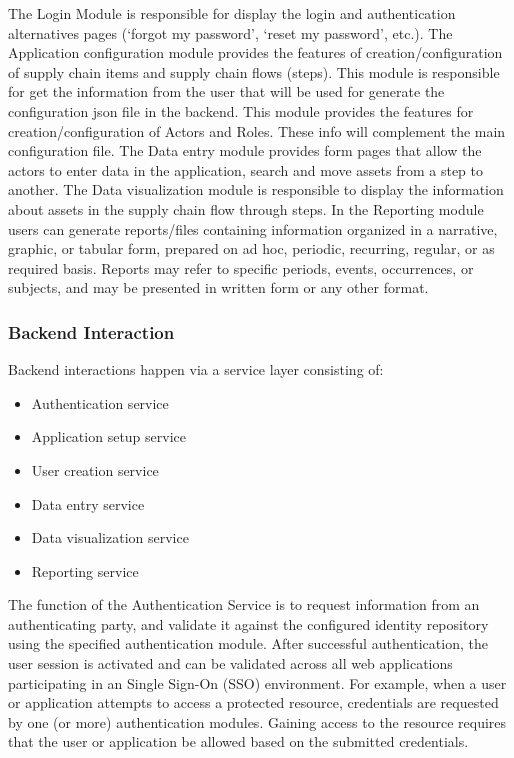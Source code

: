 The Login Module is responsible for display the login and authentication alternatives pages (‘forgot my password’, ‘reset my password’, etc.). The Application configuration module provides the features of creation/configuration of supply chain items and supply chain flows (steps). This module is responsible for get the information from the user that will be used for generate the configuration json file in the backend. This module provides the features for creation/configuration of Actors and Roles. These info will complement the main configuration file. The Data entry module provides form pages that allow the actors to enter data in the application, search and move assets from a step to another. The Data visualization module is responsible to display the information about assets in the supply chain flow through steps. In the Reporting module users can generate reports/files containing information organized in a narrative, graphic, or tabular form, prepared on ad hoc, periodic, recurring, regular, or as required basis. Reports may refer to specific periods, events, occurrences, or subjects, and may be presented in written form or any other format.

\subsubsection{Backend Interaction}\label{sec:BackendInteraction}
Backend interactions happen via a service layer consisting of:

\begin{itemize}
\item Authentication service
\item Application setup service
\item User creation service
\item Data entry service
\item Data visualization service
\item Reporting service
\end{itemize}

The function of the Authentication Service is to request information from an authenticating party, and validate it against the configured identity repository using the specified authentication module. After successful authentication, the user session is activated and can be validated across all web applications participating in an Single Sign-On (SSO) environment. For example, when a user or application attempts to access a protected resource, credentials are requested by one (or more) authentication modules. Gaining access to the resource requires that the user or application be allowed based on the submitted credentials.

